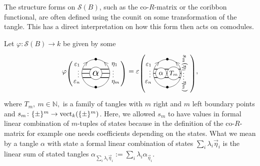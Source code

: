 \documentclass[pdftex]{sigma}%
\numberwithin{equation}{section}
\begin{document}
\begin{Remark}\label{rmkFormActOnSS}
The structure forms on $\mathscr{S}(B)$, such as the co-$R$-matrix or the coribbon functional, are often defined using the counit on some transformation of the tangle. This has a direct interpretation on how this form then acts on comodules.

Let $\varphi\colon\mathscr{S}(B) \to k$ be given by some
\[
\varphi\raisebox{-3pt}{$\left(\rule{0pt}{22pt}\right.$}\!\!
\begin{tikzpicture}[scale = 0.7, baseline = 0pt]
\draw (0,-1) node{\small $\bullet$} arc(-90:90:1) node[near end, sloped]{\small $<$} node{\small $\bullet$};
\draw (0,-1) arc(-90:-270:1) node[near end, sloped]{\small $>$};
\draw[thick] (-0.94,-0.3)node[below left]{\small $\varepsilon_n$} -- (0.94,-0.3)node[below right]{\small $\eta_m$};
\draw[thick] (-1,0) node[yshift=2pt,left]{\footnotesize $\vdots$} -- (1,0)node[yshift=2pt,right]{\footnotesize $\vdots$};
\draw[thick] (-0.94,0.3) node[above left]{\small $\varepsilon_1$} -- (0.94,0.3)node[above right]{\small $\eta_1$};
\node[circle, fill=white, draw = black, scale = 1.5, inner sep = 1.5pt] (X) at (0,0){$\alpha$};
\end{tikzpicture}\!\!
\raisebox{-3pt}{$\left.\rule{0pt}{22pt}\right)$}
 = \varepsilon
\raisebox{-3pt}{$\left(\rule{0pt}{32pt}\right.$}\!\!\!
\begin{tikzpicture}[scale = 0.7, baseline = 0pt]
\draw (0,-1) node{\small $\bullet$} arc(-90:90:1) node[near end, sloped]{\small $<$} node{\small $\bullet$};
\draw (0,-1) arc(-90:-270:1) node[near end, sloped]{\small $>$};
\draw[thick] (-0.94,-0.3)node[below left]{\small $\varepsilon_n$} -- (0.94,-0.3);
\draw[thick] (-1,0) node[yshift=2pt,left]{\footnotesize $\vdots$} -- (1,0)node[xshift = 5pt, yshift = 0pt, rotate = -90]{\small $s_m(\eta_1 \dots \eta_m)$};
\draw[thick] (-0.94,0.3) node[above left]{\small $\varepsilon_1$} -- (0.94,0.3);
\node[circle, minimum width=0.55cm, fill=white, draw = black, scale = 1, inner sep = 1.5pt] (X) at (-0.45,0){$\alpha$};
\node[circle, minimum width=0.5cm,fill=white, draw = black, scale = 1, inner sep = 1.5pt] at (0.45,0){\small $T_m$};
\end{tikzpicture}\!
\raisebox{-3pt}{$\left.\rule{0pt}{32pt}\right)$},
\]
where $T_m,\ m \in \mathbb{N},$ is a family of tangles with $m$ right and $m$ left boundary points and $s_m\colon \{\pm\}^m\to {\rm vect}_ k(\{\pm\}^m)$. Here, we allowed $s_m$ to have values in formal linear combination of $m$-tuples of states because in the definition of the co-$R$-matrix for example one needs coefficients depending on the states. What we mean by a tangle $\alpha$ with state a formal linear combination of states $\sum_i \lambda_i \vec{\eta}_i$ is the linear sum of stated tangles $\alpha_{\sum_i \lambda_i \vec{\eta}_i} := \sum_i \lambda_i \alpha_{\vec{\eta}_i}$.

\end{Remark}
\end{document}

